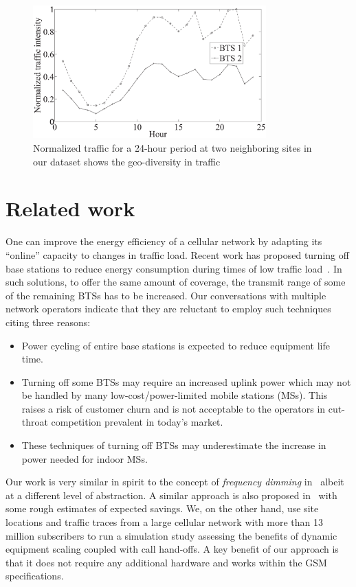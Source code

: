 \begin{figure}
\centering
{\includegraphics[width=0.8\textwidth]{pics/traffic-bw.eps}
\caption{Normalized traffic for a 24-hour period at two neighboring sites in our dataset shows the geo-diversity in traffic}
\label{fig:traffic}
}
\end{figure}

\section{Related work}
\label{sec:case2:related}
One can improve the energy efficiency of a cellular network by
adapting its ``online'' capacity to changes in traffic load.
Recent work has proposed turning off base stations to reduce
energy consumption during times of low traffic
load~\cite{Louhi:2007:BTSPower:INTELEC,Oh:Comm:2011,Peng:2011:BTSSaving:Mobicom,He:CellularPower:JN:2012}.
In such solutions, to offer the same amount of coverage, the transmit range of some of the remaining BTSs has to be increased. Our conversations with multiple network operators
indicate that they are reluctant to employ such techniques
citing three reasons:
\begin{itemize}
\item Power cycling of entire base stations is expected to
    reduce equipment life time.
\item Turning off some BTSs may require an increased uplink
    power which may not be handled by many low-cost/power-limited mobile
    stations (MSs). This raises a risk of customer churn and is
    not acceptable to the operators in cut-throat
    competition prevalent in today's market.
\item These techniques of turning off BTSs may
    underestimate the increase in power needed for indoor
    MSs.
\end{itemize}

Our work is very similar in spirit to the concept of
\textit{frequency dimming}
in~\cite{Tipper:Dimming:Globecom:2010} albeit at a different
level of abstraction. A similar approach is also proposed
in~\cite{Blume:2010:BLTJ:CellularPower} with some rough
estimates of expected savings. We, on the other hand, use site
locations and traffic traces from a large cellular network with
more than 13 million subscribers to run a simulation study
assessing the benefits of dynamic equipment scaling coupled
with call hand-offs.
A key benefit of our approach is that it 
does not require any additional hardware
and works within the GSM specifications.

